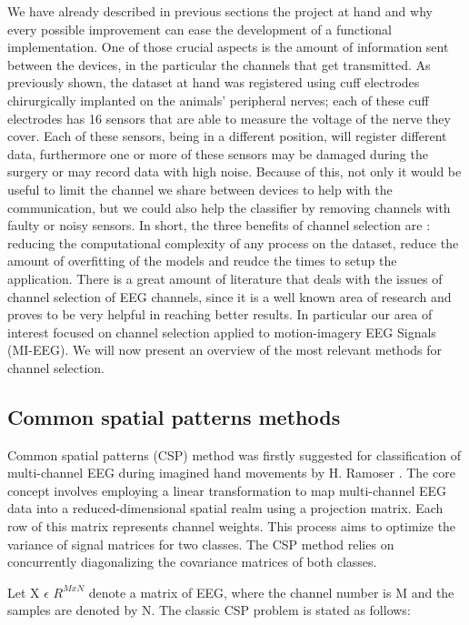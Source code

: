 \documentclass{Configuration_Files/PoliMi3i_thesis}
\begin{document}
We have already described in previous sections the project at hand and why every possible improvement can ease the development of a functional implementation.
One of those crucial aspects is the amount of information sent between the devices, in the particular the channels that get transmitted.
As previously shown, the dataset at hand was registered using cuff electrodes chirurgically implanted on the animals' peripheral nerves; each of these cuff electrodes has 16 sensors that are able to measure the voltage of the nerve they cover.
Each of these sensors, being in a different position, will register different data, furthermore one or more of these sensors may be damaged during the surgery or may record data with high noise.
Because of this, not only it would be useful to limit the channel we share between devices to help with the communication, but we could also help the classifier by removing channels with faulty or noisy sensors.
In short, the three benefits of channel selection are : reducing the computational complexity of any process on the dataset, reduce the amount of overfitting of the models and reudce the times to setup the application. \cite{alotaibyReviewChannelSelection2015}
There is a great amount of literature that deals with the issues of channel selection of EEG channels, since it is a well known area of research and proves to be very helpful in reaching better results.
In particular our area of interest focused on channel selection applied to motion-imagery EEG Signals (MI-EEG).
We will now present an overview of the most relevant methods for channel selection.

\subsection{Common spatial patterns methods}

Common spatial patterns (CSP) method was firstly suggested for classification of multi-channel EEG during imagined hand movements by H. Ramoser \cite{ramoserOptimalSpatialFiltering2000}. The core concept involves employing a linear transformation to map multi-channel EEG data into a reduced-dimensional spatial realm using a projection matrix. Each row of this matrix represents channel weights. This process aims to optimize the variance of signal matrices for two classes. The CSP method relies on concurrently diagonalizing the covariance matrices of both classes. \cite{abdullahEEGChannelSelection2022}

Let X $\epsilon$ $R^{M x N}$ denote a matrix of EEG, where the channel number is M and the samples are denoted by N. The classic CSP problem is stated as follows:
\end{document}
